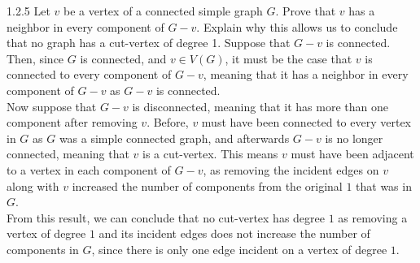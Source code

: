 \documentclass[9pt]{extarticle}
\begin{document}
\begin{problem}{1.2.5}
  Let $v$ be a vertex of a connected simple graph $G$. Prove that $v$ has a neighbor in every component of $G-v$. Explain why this allows us to conclude that no graph has a cut-vertex of degree 1.   
  \tcblower
  Suppose that $G-v$ is connected. Then, since $G$ is connected, and $v\in V(G)$, it must be the case that $v$ is connected to every component of $G-v$, meaning that it has a neighbor in every component of $G-v$ as $G-v$ is connected.\\

  Now suppose that $G-v$ is disconnected, meaning that it has more than one component after removing $v$. Before, $v$ must have been connected to every vertex in $G$ as $G$ was a simple connected graph, and afterwards $G-v$ is no longer connected, meaning that $v$ is a cut-vertex. This means $v$ must have been adjacent to a vertex in each component of $G-v$, as removing the incident edges on $v$ along with $v$ increased the number of components from the original $1$ that was in $G$.\\

  From this result, we can conclude that no cut-vertex has degree $1$ as removing a vertex of degree $1$ and its incident edges does not increase the number of components in $G$, since there is only one edge incident on a vertex of degree $1$.
\end{problem}
\end{document}
